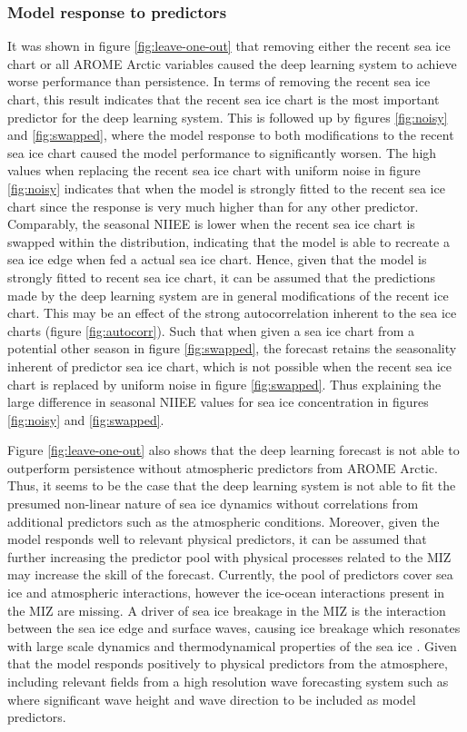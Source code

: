 \documentclass[../main/thesis]{subfiles}
\begin{document}
\subsubsection{Model response to predictors}
\label{sec:discuss_model_response}
It was shown in figure \ref{fig:leave-one-out} that removing either the recent sea ice chart or all AROME Arctic variables caused the deep learning system to achieve worse performance than persistence. In terms of removing the recent sea ice chart, this result indicates that the recent sea ice chart is the most important predictor for the deep learning system. This is followed up by figures \ref{fig:noisy} and \ref{fig:swapped}, where the model response to both modifications to the recent sea ice chart caused the model performance to significantly worsen. The high values when replacing  the recent sea ice chart with uniform noise in figure \ref{fig:noisy} indicates that when the model is strongly fitted to the recent sea ice chart since the response is very much higher than for any other predictor. Comparably, the seasonal NIIEE is lower when the recent sea ice chart is swapped within the distribution, indicating that the model is able to recreate a sea ice edge when fed a actual sea ice chart. Hence, given that the model is strongly fitted to recent sea ice chart, it can be assumed that the predictions made by the deep learning system are in general modifications of the recent ice chart. This may be an effect of the strong autocorrelation inherent to the sea ice charts (figure \ref{fig:autocorr}). Such that when given a sea ice chart from a potential other season in figure \ref{fig:swapped}, the forecast retains the seasonality inherent of predictor sea ice chart, which is not possible when the recent sea ice chart is replaced by uniform noise in figure \ref{fig:swapped}. Thus explaining the large difference in seasonal NIIEE values for sea ice concentration in figures \ref{fig:noisy} and \ref{fig:swapped}.

Figure \ref{fig:leave-one-out} also shows that the deep learning forecast is not able to outperform persistence without atmospheric predictors from AROME Arctic. Thus, it seems to be the case that the deep learning system is not able to fit the presumed non-linear nature of sea ice dynamics \citep{Grigoryev2022} without correlations from additional predictors such as the atmospheric conditions. Moreover, given the model responds well to relevant physical predictors, it can be assumed that further increasing the predictor pool with physical processes related to the MIZ may increase the skill of the forecast. Currently, the pool of predictors cover sea ice and atmospheric interactions, however the ice-ocean interactions present in the MIZ are missing. A driver of sea ice breakage in the MIZ is the interaction between the sea ice edge and surface waves, causing ice breakage which resonates with large scale dynamics and thermodynamical properties of the sea ice \citep{Williams2013}. Given that the model responds positively to physical predictors from the atmosphere, including relevant fields from a high resolution wave forecasting system such as \citet{Carrasco2022} where significant wave height and wave direction to be included as model predictors.
\end{document}
